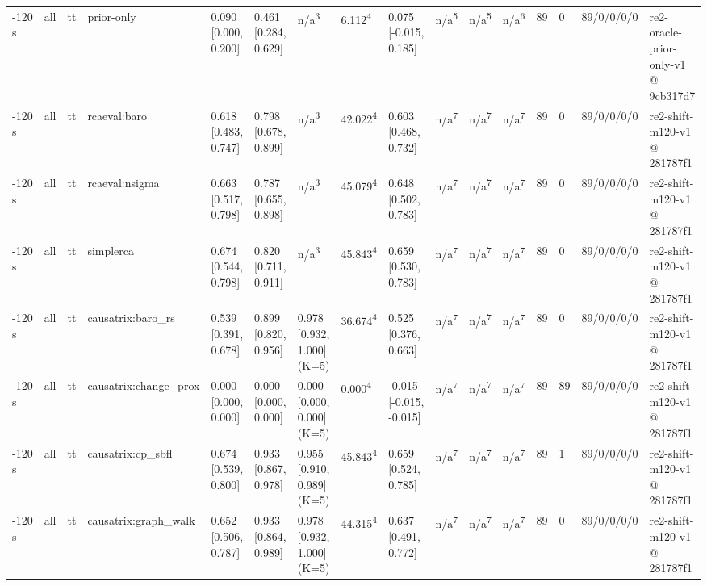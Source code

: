 \begin{table}[t]
\begin{tabular}{llllllllllllllll}
-120 s & all & tt & prior-only & 0.090 [0.000, 0.200] & 0.461 [0.284, 0.629] & n/a\textsuperscript{3} & 6.112\textsuperscript{4} & 0.075 [-0.015, 0.185] & n/a\textsuperscript{5} & n/a\textsuperscript{5} & n/a\textsuperscript{6} & 89 & 0 & 89/0/0/0/0 & re2-oracle-prior-only-v1 @ 9cb317d7 \\
-120 s & all & tt & rcaeval:baro & 0.618 [0.483, 0.747] & 0.798 [0.678, 0.899] & n/a\textsuperscript{3} & 42.022\textsuperscript{4} & 0.603 [0.468, 0.732] & n/a\textsuperscript{7} & n/a\textsuperscript{7} & n/a\textsuperscript{7} & 89 & 0 & 89/0/0/0/0 & re2-shift-m120-v1 @ 281787f1 \\
-120 s & all & tt & rcaeval:nsigma & 0.663 [0.517, 0.798] & 0.787 [0.655, 0.898] & n/a\textsuperscript{3} & 45.079\textsuperscript{4} & 0.648 [0.502, 0.783] & n/a\textsuperscript{7} & n/a\textsuperscript{7} & n/a\textsuperscript{7} & 89 & 0 & 89/0/0/0/0 & re2-shift-m120-v1 @ 281787f1 \\
-120 s & all & tt & simplerca & 0.674 [0.544, 0.798] & 0.820 [0.711, 0.911] & n/a\textsuperscript{3} & 45.843\textsuperscript{4} & 0.659 [0.530, 0.783] & n/a\textsuperscript{7} & n/a\textsuperscript{7} & n/a\textsuperscript{7} & 89 & 0 & 89/0/0/0/0 & re2-shift-m120-v1 @ 281787f1 \\
-120 s & all & tt & causatrix:baro\_rs & 0.539 [0.391, 0.678] & 0.899 [0.820, 0.956] & 0.978 [0.932, 1.000] (K=5) & 36.674\textsuperscript{4} & 0.525 [0.376, 0.663] & n/a\textsuperscript{7} & n/a\textsuperscript{7} & n/a\textsuperscript{7} & 89 & 0 & 89/0/0/0/0 & re2-shift-m120-v1 @ 281787f1 \\
-120 s & all & tt & causatrix:change\_prox & 0.000 [0.000, 0.000] & 0.000 [0.000, 0.000] & 0.000 [0.000, 0.000] (K=5) & 0.000\textsuperscript{4} & -0.015 [-0.015, -0.015] & n/a\textsuperscript{7} & n/a\textsuperscript{7} & n/a\textsuperscript{7} & 89 & 89 & 89/0/0/0/0 & re2-shift-m120-v1 @ 281787f1 \\
-120 s & all & tt & causatrix:cp\_sbfl & 0.674 [0.539, 0.800] & 0.933 [0.867, 0.978] & 0.955 [0.910, 0.989] (K=5) & 45.843\textsuperscript{4} & 0.659 [0.524, 0.785] & n/a\textsuperscript{7} & n/a\textsuperscript{7} & n/a\textsuperscript{7} & 89 & 1 & 89/0/0/0/0 & re2-shift-m120-v1 @ 281787f1 \\
-120 s & all & tt & causatrix:graph\_walk & 0.652 [0.506, 0.787] & 0.933 [0.864, 0.989] & 0.978 [0.932, 1.000] (K=5) & 44.315\textsuperscript{4} & 0.637 [0.491, 0.772] & n/a\textsuperscript{7} & n/a\textsuperscript{7} & n/a\textsuperscript{7} & 89 & 0 & 89/0/0/0/0 & re2-shift-m120-v1 @ 281787f1 \\

\end{tabular}
\end{table}
